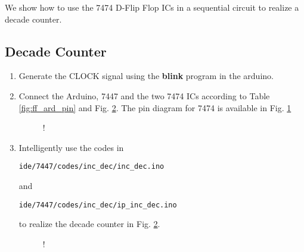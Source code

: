 We show how to use the 7474 D-Flip Flop ICs in
a sequential circuit to realize a decade counter.
\iffalse
\subsection{Components}
\begin{table}[H]
\centering

\caption{}
\label{table:components-7474}
\end{table}
\fi
\subsection{Decade Counter}
\begin{enumerate}[label=\arabic*.,ref=\theenumi]
\item
Generate the CLOCK signal using the \textbf{blink} program in the arduino. 
\item
Connect the Arduino, 7447 and the two 7474 ICs according to Table \ref{fig:ff_ard_pin} and Fig. \ref{fig:decade_counter}. The pin diagram for 7474 is available in Fig. \ref{fig:7474}
			\begin{table}[H]
\centering

\caption{}
\label{fig:ff_ard_pin}
\end{table}
%
\begin{figure}[H]
\begin{center}
\resizebox {0.75\columnwidth} {!} {

}
\end{center}
\caption{}
\label{fig:7474}
\end{figure}

%
\item
Intelligently use the codes in 
\begin{lstlisting}
ide/7447/codes/inc_dec/inc_dec.ino
\end{lstlisting}
and
\begin{lstlisting}
ide/7447/codes/inc_dec/ip_inc_dec.ino
\end{lstlisting}
to realize the decade counter in Fig. \ref{fig:decade_counter}.
% 
 \begin{figure}[H]
\begin{center}
\resizebox {0.75\columnwidth} {!} {

}
\end{center}
\caption{}
\label{fig:decade_counter}
\end{figure}
%
	\end{enumerate}


